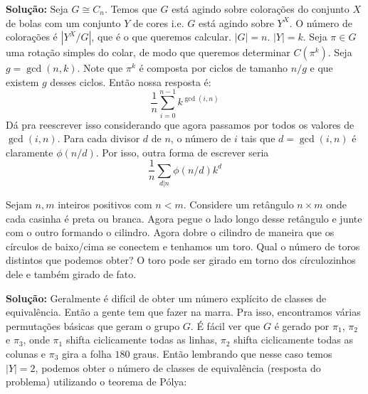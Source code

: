 \textbf{Solução:} Seja $G \cong C_n$. Temos que $G$ está agindo sobre colorações do conjunto $X$ de bolas com um conjunto $Y$ de cores i.e. $G$ está agindo sobre $Y^X$. O número de colorações é $|Y^X/G|$, que é o que queremos calcular. $|G| = n$. $|Y|=k$. Seja $\pi \in G$ uma rotação simples do colar, de modo que queremos determinar $C(\pi^k)$. Seja $g = \gcd(n, k)$. Note que $\pi^k$ é composta por ciclos de tamanho $n/g$ e que existem $g$ desses ciclos. Então nossa resposta é:
$$ \dfrac{1}{n} \sum\limits_{i=0}^{n-1} k^{\gcd(i, n)}$$
Dá pra reescrever isso considerando que agora passamos por todos os valores de $\gcd(i, n)$. Para cada divisor $d$ de $n$, o número de $i$ tais que $d = \gcd(i, n)$ é claramente $\phi(n/d)$. Por isso, outra forma de escrever seria
$$ \dfrac{1}{n} \sum\limits_{d | n} \phi(n/d) k^d$$

 Sejam $n, m$ inteiros positivos com $n < m$. Considere um retângulo $n \times m$ onde cada casinha é preta ou branca. Agora pegue o lado longo desse retângulo e junte com o outro formando o cilindro. Agora dobre o cilindro de maneira que os círculos de baixo/cima se conectem e tenhamos um toro. Qual o número de toros distintos que podemos obter? O toro pode ser girado em torno dos círculozinhos dele e também girado de fato.

\textbf{Solução:} Geralmente é difícil de obter um número explícito de classes de equivalência. Então a gente tem que fazer na marra. Pra isso, encontramos várias permutações básicas que geram o grupo $G$. É fácil ver que $G$ é gerado por $\pi_1$, $\pi_2$ e $\pi_3$, onde $\pi_1$ shifta ciclicamente todas as linhas, $\pi_2$ shifta ciclicamente todas as colunas e $\pi_3$ gira a folha $180$ graus. Então lembrando que nesse caso temos $|Y|=2$, podemos obter o número de classes de equivalência (resposta do problema) utilizando o teorema de Pólya:

